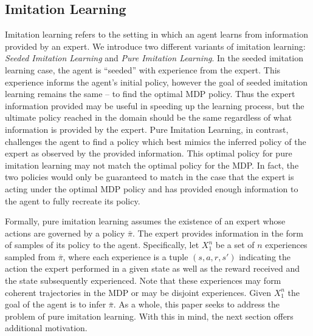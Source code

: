 \documentclass{article} %
\begin{document}
\subsection{Imitation Learning}
Imitation learning refers to the setting in which an agent learns from information provided by an expert. We introduce two different variants of imitation learning: \textit{Seeded Imitation Learning} and \textit{Pure Imitation Learning}. In the seeded imitation learning case, the agent is ``seeded'' with experience from the expert. This experience informs the agent's initial policy, however the goal of seeded imitation learning remains the same -- to find the optimal MDP policy. Thus the expert information provided may be useful in speeding up the learning process, but the ultimate policy reached in the domain should be the same regardless of what information is provided by the expert. Pure Imitation Learning, in contrast, challenges the agent to find a policy which best mimics the inferred policy of the expert as observed by the provided information. This optimal policy for pure imitation learning may not match the optimal policy for the MDP. In fact, the two policies would only be guaranteed to match in the case that the expert is acting under the optimal MDP policy and has provided enough information to the agent to fully recreate its policy.

Formally, pure imitation learning assumes the existence of an expert whose actions are governed by a policy $\bar{\pi}$. The expert provides information in the form of samples of its policy to the agent. Specifically, let $X_1^n$ be a set of $n$ experiences sampled from $\bar\pi$, where each experience is a tuple $(s,a,r,s')$ indicating the action the expert performed in a given state as well as the reward received and the state subsequently experienced. Note that these experiences may form coherent trajectories in the MDP or may be disjoint experiences. Given $X_1^n$ the goal of the agent is to infer $\bar{\pi}$. As a whole, this paper seeks to address the problem of pure imitation learning. With this in mind, the next section offers additional motivation.
\end{document}
